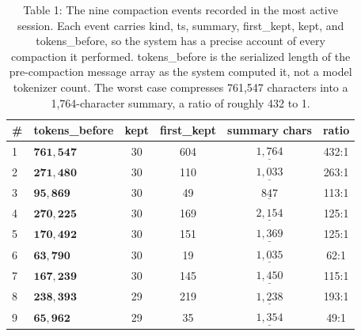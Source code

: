 \begin{table}[t]
\centering
\caption{Table 1: The nine compaction events recorded in the most active session. Each event carries kind, ts, summary, first_kept, kept, and tokens_before, so the system has a precise account of every compaction it performed. tokens_before is the serialized length of the pre-compaction message array as the system computed it, not a model tokenizer count. The worst case compresses 761,547 characters into a 1,764-character summary, a ratio of roughly 432 to 1.}
\label{tab:compaction_events}
\begin{tabular}{llcccc}
\toprule
\textbf{#} & \textbf{tokens_before} & \textbf{kept} & \textbf{first_kept} & \textbf{summary chars} & \textbf{ratio} \\
\midrule
1 & $\mathbf{761,547}$ & 30 & 604 & $\underline{1,764}$ & 432:1 \\
2 & $\mathbf{271,480}$ & 30 & 110 & $\underline{1,033}$ & 263:1 \\
3 & $\mathbf{95,869}$ & 30 & 49 & $\underline{847}$ & 113:1 \\
4 & $\mathbf{270,225}$ & 30 & 169 & $\underline{2,154}$ & 125:1 \\
5 & $\mathbf{170,492}$ & 30 & 151 & $\underline{1,369}$ & 125:1 \\
6 & $\mathbf{63,790}$ & 30 & 19 & $\underline{1,035}$ & 62:1 \\
7 & $\mathbf{167,239}$ & 30 & 145 & $\underline{1,450}$ & 115:1 \\
8 & $\mathbf{238,393}$ & 29 & 219 & $\underline{1,238}$ & 193:1 \\
9 & $\mathbf{65,962}$ & 29 & 35 & $\underline{1,354}$ & 49:1 \\
\bottomrule
\end{tabular}
\end{table}
